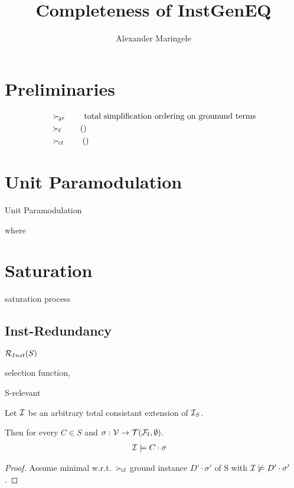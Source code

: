 \documentclass[%
handout,
]{beamer}
\title[Completeness]{Completeness of InstGenEQ}
\author[{A$\ell$M}]{%
	Alexander Maringele
}
\institute[UIBK]{%
	{alexander.maringele@gmail.com}
}
\begin{document}
\titleframe

\begin{frame}
    \nocite{GK2004csl}
    
    
\end{frame}


\section{Preliminaries}
\begin{frame}
    \begin{align*}
        &\mathrel\succ_{\!gr} \tag*{total simplification ordering on grounund terms}\\
        &\mathrel\succ_{\!\ell} \tag{}\\
        &\mathrel\succ_{\!cl} \tag{}
    \end{align*}
\end{frame}

\section{Unit Paramodulation}
\begin{frame}{Unit Paramodulation}





    \begin{definition}
    
    where
    
    \end{definition}
\end{frame}

\section{Saturation}
\begin{frame}
    saturation process
\end{frame}

\subsection{Inst-Redundancy}

\begin{frame}
    $\mathcal{R}_{Inst}(S)$

    selection function,

    S-relevant
\end{frame}

\begin{frame}
    \begin{Lemma}
        Let $\mathcal{I}$ be an arbitrary total consistant extension of $\mathcal{I}_S$.

        Then for every $C\in S$ and $\sigma:\mathcal{V}\to{\mathcal{T}(\mathcal{F}_{\mathsf{f}},\emptyset)}$.
        \begin{align*}
            \mathcal{I} &\models C\cdot\sigma
        \end{align*}
    \end{Lemma}

    \begin{proof}
        Assume minimal w.r.t.~$\mathrel\succ_{\!cl}$
        ground instance $D'\cdot\sigma'$ of S with $\mathcal{I}\not\models D'\cdot\sigma'$.
    \end{proof}
\end{frame}
\end{document}
